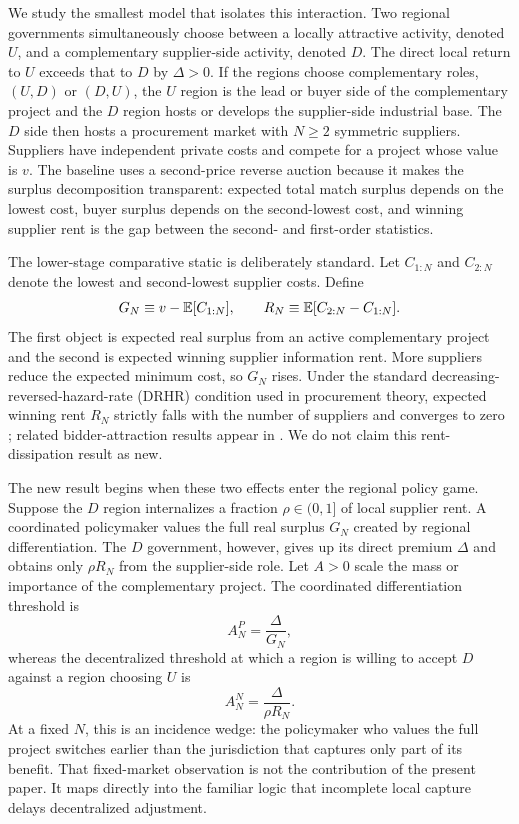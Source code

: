 We study the smallest model that isolates this interaction. Two regional governments simultaneously choose between a locally attractive activity, denoted $U$, and a complementary supplier-side activity, denoted $D$. The direct local return to $U$ exceeds that to $D$ by $\Delta>0$. If the regions choose complementary roles, $(U,D)$ or $(D,U)$, the $U$ region is the lead or buyer side of the complementary project and the $D$ region hosts or develops the supplier-side industrial base. The $D$ side then hosts a procurement market with $N\geq2$ symmetric suppliers. Suppliers have independent private costs and compete for a project whose value is $v$. The baseline uses a second-price reverse auction because it makes the surplus decomposition transparent: expected total match surplus depends on the lowest cost, buyer surplus depends on the second-lowest cost, and winning supplier rent is the gap between the second- and first-order statistics.

The lower-stage comparative static is deliberately standard. Let $C_{1:N}$ and $C_{2:N}$ denote the lowest and second-lowest supplier costs. Define
\begin{equation}
G_N\equiv v-\mathbb{E}[C_{1:N}],
\qquad
R_N\equiv \mathbb{E}[C_{2:N}-C_{1:N}].
\label{eq:intro-GR}
\end{equation}
The first object is expected real surplus from an active complementary project and the second is expected winning supplier information rent. More suppliers reduce the expected minimum cost, so $G_N$ rises. Under the standard decreasing-reversed-hazard-rate (DRHR) condition used in procurement theory, expected winning rent $R_N$ strictly falls with the number of suppliers and converges to zero \citep{Li2005,XuLi2019}; related bidder-attraction results appear in \citet{Szech2011}. We do not claim this rent-dissipation result as new.

The new result begins when these two effects enter the regional policy game. Suppose the $D$ region internalizes a fraction $\rho\in(0,1]$ of local supplier rent. A coordinated policymaker values the full real surplus $G_N$ created by regional differentiation. The $D$ government, however, gives up its direct premium $\Delta$ and obtains only $\rho R_N$ from the supplier-side role. Let $A>0$ scale the mass or importance of the complementary project. The coordinated differentiation threshold is
\begin{equation}
A_N^P=\frac{\Delta}{G_N},
\label{eq:intro-AP}
\end{equation}
whereas the decentralized threshold at which a region is willing to accept $D$ against a region choosing $U$ is
\begin{equation}
A_N^N=\frac{\Delta}{\rho R_N}.
\label{eq:intro-AN}
\end{equation}
At a fixed $N$, this is an incidence wedge: the policymaker who values the full project switches earlier than the jurisdiction that captures only part of its benefit. That fixed-market observation is not the contribution of the present paper. It maps directly into the familiar logic that incomplete local capture delays decentralized adjustment.

